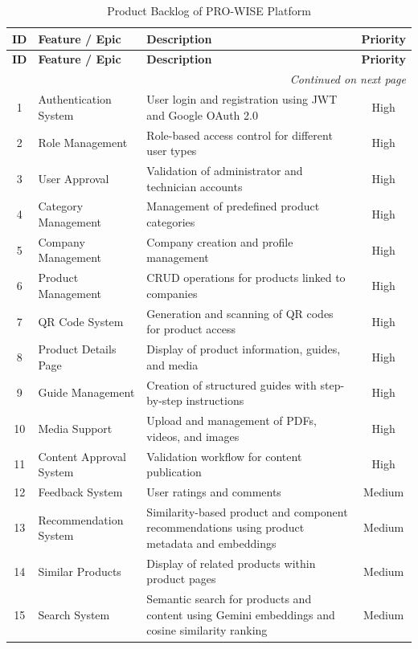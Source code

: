\documentclass[12pt,a4paper]{report}
\begin{document}
\begin{longtable}{clp{8cm}c}
\caption{Product Backlog of PRO-WISE Platform} \label{tab:product_backlog} \\
\toprule
\textbf{ID} & \textbf{Feature / Epic} & \textbf{Description} & \textbf{Priority} \\
\midrule
\endfirsthead

\toprule
\textbf{ID} & \textbf{Feature / Epic} & \textbf{Description} & \textbf{Priority} \\
\midrule
\endhead

\midrule
\multicolumn{4}{r}{\textit{Continued on next page}} \\
\bottomrule
\endfoot

\bottomrule
\endlastfoot

1 & Authentication System & User login and registration using JWT and Google OAuth 2.0 & High \\
2 & Role Management & Role-based access control for different user types & High \\
3 & User Approval & Validation of administrator and technician accounts & High \\
4 & Category Management & Management of predefined product categories & High \\
5 & Company Management & Company creation and profile management & High \\
6 & Product Management & CRUD operations for products linked to companies & High \\
7 & QR Code System & Generation and scanning of QR codes for product access & High \\
8 & Product Details Page & Display of product information, guides, and media & High \\
9 & Guide Management & Creation of structured guides with step-by-step instructions & High \\
10 & Media Support & Upload and management of PDFs, videos, and images & High \\
11 & Content Approval System & Validation workflow for content publication & High \\
12 & Feedback System & User ratings and comments & Medium \\
13 & Recommendation System & Similarity-based product and component recommendations using product metadata and embeddings & Medium \\
14 & Similar Products & Display of related products within product pages & Medium \\
15 & Search System & Semantic search for products and content using Gemini embeddings and cosine similarity ranking & Medium \\

\end{longtable}
\end{document}
